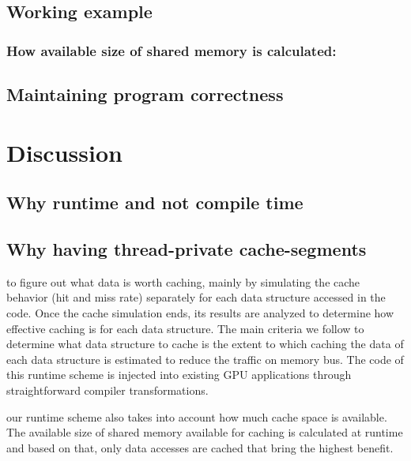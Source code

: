 \subsection{Working example}


\subsubsection{How available size of shared memory is calculated:} 


\subsection{Maintaining program correctness}





\section{Discussion}
\subsection{Why runtime and not compile time}
\subsection{Why having thread-private cache-segments}

to figure out what data is worth caching, mainly by simulating the cache behavior (hit and miss
rate) separately for each data structure accessed in the code. Once the cache simulation ends, its
results are analyzed to determine how effective caching is for each data structure. The main
criteria we follow to determine what data structure to cache is the extent to which caching the data
of each data structure is estimated to reduce the traffic on memory bus. The code of this runtime
scheme is injected into existing GPU applications through straightforward compiler transformations.



our runtime scheme also takes into account how much cache space is available. The
available size of shared memory available for caching is calculated at runtime and based on that, only data accesses are
cached that bring the highest benefit.

